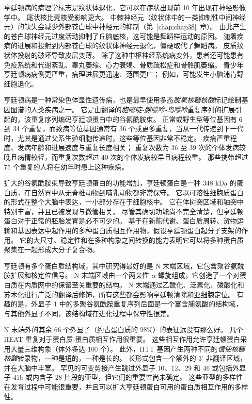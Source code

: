 亨廷顿病的病理学标志是纹状体退化，它可以在症状出现前 10 年出现在神经影像学中。
尾状核比壳核受影响更大。
中棘神经元（纹状体中的一类抑制性中间神经元）的缺失会减少外部苍白球中神经元的抑制（第~\ref{chap:chap38}~章）。
由此产生的苍白球神经元过度活动抑制了丘脑底核，这可能是舞蹈样运动的原因。
随着疾病的进展和投射到内部苍白球的纹状体神经元退化，僵硬取代了舞蹈病。
皮质纹状体投射的破坏导致皮层变薄。
除了这种中枢神经系统病变外，患者还可能患有免疫系统和代谢紊乱、睾丸萎缩、心力衰竭、骨质疏松症和骨骼肌萎缩。
青少年亨廷顿病病例更严重，病理进展更迅速、范围更广；
例如，可能发生小脑浦肯野细胞退化。


亨廷顿病是一种常染色体显性遗传病，也是最早使用多态\textit{脱氧核糖核酸}标记绘制基因图谱的人类疾病之一。
它是由翻译的\textit{胞嘧啶-腺嘌呤-鸟嘌呤}重复序列的扩展引起的，该重复序列编码亨廷顿蛋白中的谷氨酰胺束。
正常或野生型等位基因有 6 到 34 个重复，而致病等位基因通常有 36 个或更多重复，当从一代传递到下一代时，尤其是通过父系生殖细胞传递时，这些等位基因非常不稳定。
疾病严重程度、发病年龄和进展速度与重复长度相关；
重复次数为 36 至 39 次的个体发病较晚且病情较轻，而重复次数超过 40 次的个体发病较早且病程较重。
那些携带超过 75 个重复的人将在幼年时患上这种疾病。


扩大的谷氨酰胺束导致亨廷顿蛋白的功能增加，亨廷顿蛋白是一种 348 kDa 的蛋白质，在自然界中从无脊椎动物到哺乳动物都非常保守。
它以可溶性细胞质蛋白的形式在整个大脑中表达，一小部分存在于细胞核中。
它在体树突区域和轴突中特别丰富，并且已被发现与微管相关。
尽管其确切功能尚不完全清楚，但亨廷顿蛋白对于正常的胚胎发育是必不可少的。
基于在新陈代谢、蛋白质周转、货物运输和基因表达中起作用的多种蛋白质相互作用物，假设亨廷顿蛋白起分子支架的作用。
它的大尺寸、稳定性和在多种构象之间转换的能力表明它可以将多种蛋白质聚集在一起形成大分子复合物。


亨廷顿有多个蛋白质结构域，其中研究得最好的是 N 末端区域，它包含聚谷氨酰胺扩展和核定位信号。
N 末端区域由一个两亲性 $\alpha$ 螺旋组成，它创造了一个对蛋白质在内质网中的保留至关重要的结构。
N 末端通过乙酰化、泛素化、磷酸化和苏木化进行广泛的翻译后修饰，所有这些都会影响亨廷顿清除和亚细胞定位。
有趣的是，外显子 1 中的多聚谷氨酰胺重复序列后面是一个富含脯氨酸的结构域，与其他外显子不同，该结构域在进化过程中保守性很差。


N 末端外的其余 66 个外显子（约占蛋白质的 98\%）的表征远没有那么好。
几个 HEAT 重复对于蛋白质-蛋白质相互作用很重要。
这些相互作用允许亨廷顿蛋白采用大量三维构象（体外多达 100 个）。
此外，HTT 基因产生两种不同的\textit{信使核糖核酸}转录物，一种是短的，一种是长的。
长形式包含一个额外的 3' 非翻译区域，并在大脑中丰富。
罕见的可变剪接产生跳过外显子 10、12、29 和 46 或包括外显子 41b 或内含子 28 片段的亚型，但它们的重要性尚未确定。
这些亚型的多样性在发育过程中可能很重要，并且可以扩大亨廷顿蛋白可用的蛋白质相互作用的多样性。



